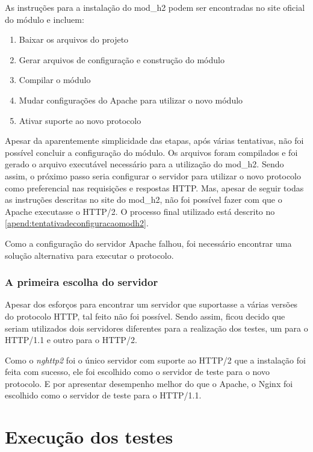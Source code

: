As instruções para a instalação do mod\_h2 podem ser encontradas no site oficial do módulo e incluem:
\begin{enumerate}
	\item Baixar os arquivos do projeto
	\item Gerar arquivos de configuração e construção do módulo
	\item Compilar o módulo
	\item Mudar configurações do Apache para utilizar o novo módulo
	\item Ativar suporte ao novo protocolo
\end{enumerate}

Apesar da aparentemente simplicidade das etapas, após várias tentativas, não foi possível concluir a configuração do módulo. Os arquivos foram compilados e foi gerado o arquivo executável necessário para a utilização do mod\_h2. Sendo assim, o próximo passo seria configurar o servidor para utilizar o novo protocolo como preferencial nas requisições e respostas HTTP. Mas, apesar de seguir todas as instruções descritas no site do mod\_h2, não foi possível fazer com que o Apache executasse o HTTP/2. O processo final utilizado está descrito no \autoref{apend:tentativadeconfiguracaomodh2}.

Como a configuração do servidor Apache falhou, foi necessário encontrar uma solução alternativa para executar o protocolo.

\subsubsection{A primeira escolha do servidor}
\label{aprimeiraescolhadoservidor}

Apesar dos esforços para encontrar um servidor que suportasse a várias versões do protocolo HTTP, tal feito não foi possível. Sendo assim, ficou decido que seriam utilizados dois servidores diferentes para a realização dos testes, um para o HTTP/1.1 e outro para o HTTP/2.

Como o \textit{nghttp2} foi o único servidor com suporte ao HTTP/2 que a instalação foi feita com sucesso, ele foi escolhido como o servidor de teste para o novo protocolo. E por apresentar desempenho melhor do que o Apache, o Nginx foi escolhido como o servidor de teste para o HTTP/1.1.


\section{Execução dos testes}
\label{execuçãodostestes}

